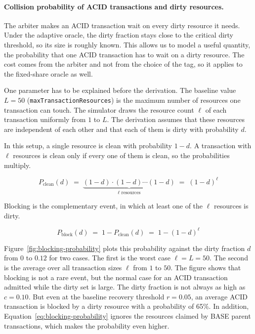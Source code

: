 \paragraph{Collision probability of ACID
  transactions and dirty resources.}\label{sec:approach-blocking-cost} The
arbiter makes an ACID transaction wait on every dirty resource it needs. Under
the adaptive oracle, the dirty fraction stays close to the critical dirty
threshold, so its size is roughly known. This allows us to model a useful
quantity, the probability that one ACID transaction has to wait on a dirty
resource. The cost comes from the arbiter and not from the choice of the tag,
so it applies to the fixed-share oracle as well.

One parameter has to be explained before the derivation. The baseline value
$L = 50$ (\texttt{maxTransactionResources}) is the maximum number of resources
one transaction can touch. The simulator draws the resource count $\ell$ of each
transaction uniformly from $1$ to $L$. The derivation assumes that these
resources are independent of each other and that each of them is dirty with
probability $d$.

In this setup, a single resource is clean with probability $1-d$. A transaction
with $\ell$ resources is clean only if every one of them is clean, so the
probabilities multiply.

\begin{equation}
  P_{\text{clean}}(d) \;=\; \underbrace{(1-d)\cdot(1-d)\cdots(1-d)}_{\ell \text{ resources}}
  \;=\; (1-d)^{\ell}
  \label{eq:clean-probability}
\end{equation}

Blocking is the complementary event, in which at least one of the $\ell$
resources is dirty.

\begin{equation}
  P_{\text{block}}(d) \;=\; 1 - P_{\text{clean}}(d) \;=\; 1-(1-d)^{\ell}
  \label{eq:blocking-probability}
\end{equation}

Figure~\ref{fig:blocking-probability} plots this probability against the dirty
fraction $d$ from $0$ to $0.12$ for two cases. The first is the worst case
$\ell = L = 50$. The second is the average over all transaction sizes $\ell$
from $1$ to $50$. The figure shows that blocking is not a rare event, but the
normal case for an ACID transaction admitted while the dirty set is large. The
dirty fraction is not always as high as $c = 0.10$. But even at the baseline
recovery threshold $r = 0.05$, an average ACID transaction is blocked by a
dirty resource with a probability of 65\%. In addition,
Equation~\ref{eq:blocking-probability} ignores the resources claimed by BASE
parent transactions, which makes the probability even higher.

